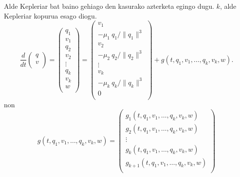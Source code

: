 Alde Kepleriar bat baino gehiago den kasurako azterketa egingo dugu. $k$, alde Kepleriar kopurua esago diogu.
\begin{equation*}
\frac{d}{dt}\left(\begin{array}{c}
                q  \\
                v  \\
\end{array}\right)=
\left(\begin{array}{c}
                q_1  \\
                v_1  \\
                q_2  \\
                v_2  \\
                \vdots \\
                q_k    \\
                v_k    \\
                w      \\
\end{array}\right)=
\left(\begin{array}{c}
                v_1  \\
                -\mu_1 \ q_1/\|q_1\|^3  \\
                v_2  \\
                -\mu_2 \ q_2/\|q_2\|^3  \\
                \vdots \\
                v_k    \\
                -\mu_k \ q_k/\|q_k\|^3  \\
                0      \\
\end{array}\right)+
g(t,q_1,v_1,\dots, q_k,v_k,w).
\end{equation*} 
non 
\begin{equation*}
g(t,q_1,v_1,\dots, q_k,v_k,w)=
\left(\begin{array}{c}
                g_1(t,q_1,v_1,\dots, q_k,v_k,w)      \\
                g_2 (t,q_1,v_1,\dots, q_k,v_k,w)     \\
                \vdots   \\
                g_k (t,q_1,v_1,\dots, q_k,v_k,w)      \\
                g_{k+1}(t,q_1,v_1,\dots, q_k,v_k,w)    \\
\end{array}\right)
\end{equation*}

